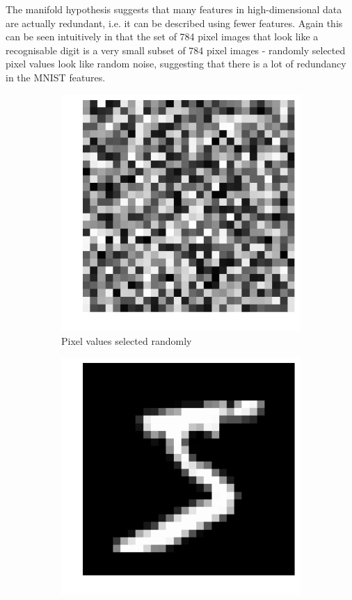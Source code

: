 The manifold hypothesis suggests that many features in high-dimensional data are actually redundant,
i.e. it can be described using fewer features. Again this can be seen intuitively in that the set of 784 pixel images 
that look like a recognisable digit is a very small subset of 784 pixel images - randomly selected pixel values look like 
random noise, suggesting that there is a lot of redundancy in the MNIST features.
\begin{figure}[H]
  \centering
  \begin{subfigure}[b]{0.4\linewidth}
    \centering
    \includegraphics[scale=.25]{figs/rand_noise.pdf}
    \caption{Pixel values selected randomly}
  \end{subfigure}
  \begin{subfigure}[b]{0.4\linewidth}
    \centering
    \includegraphics[scale=.25]{figs/digit.pdf}

\end{subfigure}
\end{figure}
